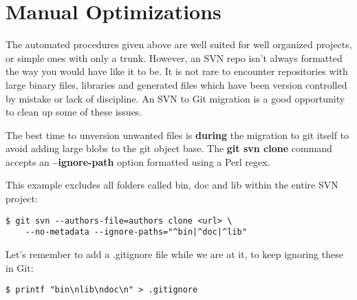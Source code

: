 \documentclass{../common/tufte-latex/tufte-handout}
\begin{document}
\section{Manual Optimizations}

The automated procedures given above are well suited for well organized projects, or simple ones with only a trunk.
However, an SVN repo isn't always formatted the way you would have like it to be.
It is not rare to encounter repositories with large binary files, libraries and generated files which have been version controlled by mistake or lack of discipline.
An SVN to Git migration is a good opportunity to clean up some of these issues.

The best time to unversion unwanted files is \textbf{during} the migration to git itself to avoid adding large blobs to the git object base.
The \textbf{git svn clone} command accepts an \textbf{--ignore-path} option formatted using a Perl regex.

This example excludes all folders called bin, doc and lib within the entire SVN project:

\begin{lstlisting}[style=BashInputStyle]
  $ git svn --authors-file=authors clone <url> \ 
    --no-metadata --ignore-paths="^bin|^doc|^lib"
\end{lstlisting}

Let's remember to add a .gitignore file while we are at it, to keep ignoring these in Git:

\begin{lstlisting}[style=BashInputStyle]
  $ printf "bin\nlib\ndoc\n" > .gitignore
\end{lstlisting}




\end{document}
